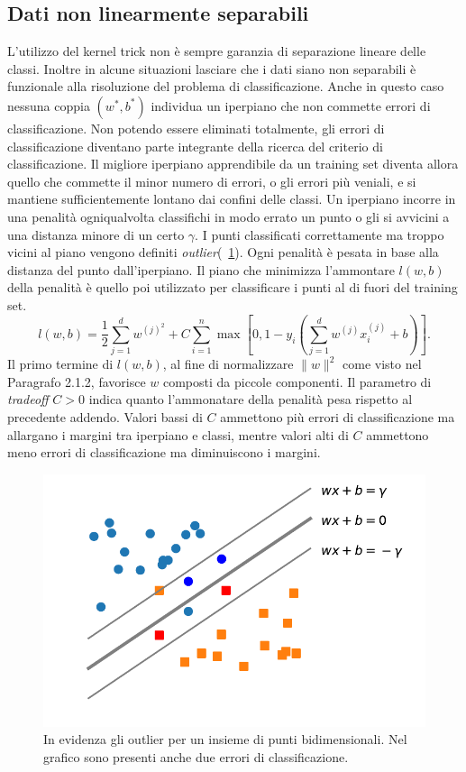 \documentclass [11pt,a4paper,twoside,openright] {book}
\begin{document}
\subsection{Dati non linearmente separabili}
L'utilizzo del kernel trick non è sempre garanzia di separazione lineare delle classi. Inoltre in alcune situazioni lasciare che i dati siano non separabili è funzionale alla risoluzione del problema di classificazione. Anche in questo caso nessuna coppia $(w^*,b^*)$ individua un iperpiano che non commette errori di classificazione. Non potendo essere eliminati totalmente, gli errori di classificazione diventano parte integrante della ricerca del criterio di classificazione. Il migliore iperpiano apprendibile da un training set diventa allora quello che commette il minor numero di errori, o gli errori più veniali, e si mantiene sufficientemente lontano dai confini delle classi. Un iperpiano incorre in una penalità ogniqualvolta classifichi in modo errato un punto o gli si avvicini a una distanza minore di un certo $\gamma$. I punti classificati correttamente ma troppo vicini al piano vengono definiti \textit{outlier}(\figurename~\ref{outliers}). Ogni penalità è pesata in base alla distanza del punto dall'iperpiano. Il piano che minimizza l'ammontare $l(w,b)$ della penalità è quello poi utilizzato per classificare i punti al di fuori del training set.
\begin{equation}
l(w,b)= \dfrac{1}{2} \sum_{j=1}^d w^{(j)^2} + C \sum_{i=1}^n \max[0, 1 - y_i(\sum_{j=1}^d w^{(j)} x_i^{(j)} + b)].
\end{equation}
Il primo termine di $l(w,b)$, al fine di normalizzare $\parallel w \parallel ^2$ come visto nel Paragrafo 2.1.2, favorisce $w$ composti da piccole componenti. Il parametro di \textit{tradeoff} $C > 0$ indica quanto l'ammonatare della penalità pesa rispetto al precedente addendo. Valori bassi di $C$ ammettono più errori di classificazione ma allargano i margini tra iperpiano e classi, mentre valori alti di $C$ ammettono meno errori di classificazione ma diminuiscono i margini.
\begin{figure}[H]
\centering
\includegraphics[scale=.7]{figure/outliers.pdf}
\caption{In evidenza gli outlier per un insieme di punti bidimensionali. Nel grafico sono presenti anche due errori di classificazione. \label{outliers}}
\end{figure}
\end{document}
